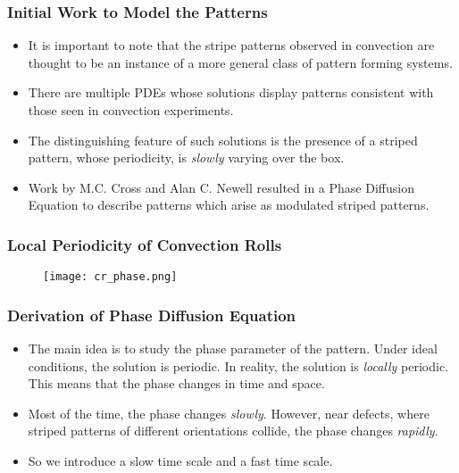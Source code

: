 \documentclass[]{beamer}
\begin{document}
\begin{frame}
    \frametitle{Initial Work to Model the Patterns}
    \begin{itemize}
        \item It is important to note that the stripe patterns observed in convection are thought to be an instance of a more general class of pattern forming systems.
        \item There are multiple PDEs whose solutions display patterns consistent with those seen in convection experiments.
        \item The distinguishing feature of such solutions is the presence of a striped pattern, whose periodicity, is \emph{slowly} varying over the box. 
        \item Work by M.C. Cross and Alan C. Newell resulted in a Phase Diffusion Equation to describe patterns which arise as modulated striped patterns.
    \end{itemize}
\end{frame}

\begin{frame}
    \frametitle{Local Periodicity of Convection Rolls}
      \begin{figure}
        \centering
        \texttt{[image: cr\_phase.png]}
    \end{figure}
\end{frame}


\begin{frame}
    \frametitle{Derivation of Phase Diffusion Equation}
    \begin{itemize}
        \item The main idea is to study the phase parameter of the pattern. Under ideal conditions, the solution is periodic. In reality, the solution is \emph{locally} periodic. This means that the phase changes in time and space. 
        \item Most of the time, the phase changes \emph{slowly}. However, near defects, where striped patterns of different orientations collide, the phase changes \emph{rapidly}.
        \item So we introduce a slow time scale and a fast time scale.
    \end{itemize}
\end{frame}
\end{document}
